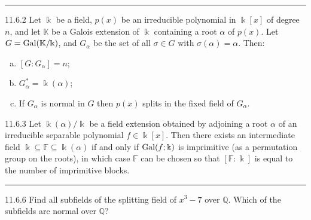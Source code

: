 \documentclass[a4paper, 12pt]{article}
\begin{document}
\noindent\rule{7in}{2.8pt}
\begin{problem}{11.6.2}
Let \(\Bbbk\) be a field, \(p(x)\) be an irreducible polynomial in \(\Bbbk[x]\) of degree \(n\), and let \(\mathbb{K}\) be a Galois extension of \(\Bbbk\) containing a root \(\alpha\) of \(p(x)\). Let \(G=\text{Gal}(\mathbb{K}/\Bbbk)\), 
and \(G_\alpha\) be the set of all \(\sigma\in G\) with \(\sigma(\alpha)=\alpha\). Then: 
\begin{enumerate}[(a)]
\item \([G:G_\alpha]=n\);
\item \(G_\alpha^*=\Bbbk(\alpha)\);
\item If \(G_\alpha\) is normal in \(G\) then \(p(x)\) splits in the fixed field of \(G_\alpha\).
\end{enumerate}
\end{problem}
\begin{solution}
    
\end{solution}
\begin{problem}{11.6.3}
Let \(\Bbbk(\alpha)/\Bbbk\) be a field extension obtained by adjoining a root \(\alpha\) of an irreducible separable polynomial \(f\in \Bbbk[x]\). 
Then there exists an intermediate field \(\Bbbk\subseteq \mathbb{F}\subseteq \Bbbk(\alpha)\) if and only if \(\text{Gal}(f;\Bbbk)\) is imprimitive (as a permutation group on the roots), in which case \(\mathbb{F}\) can be chosen so that 
\([\mathbb{F}:\Bbbk]\) is equal to the number of imprimitive blocks.
\end{problem}
\begin{solution}

\end{solution}

\noindent\rule{7in}{2.8pt}
\begin{problem}{11.6.6}
Find all subfields of the splitting field of \(x^3-7\) over \(\mathbb{Q}\). Which of the subfields are normal over \(\mathbb{Q}\)?
\end{problem}
\begin{solution}
    
\end{solution}
\end{document}
